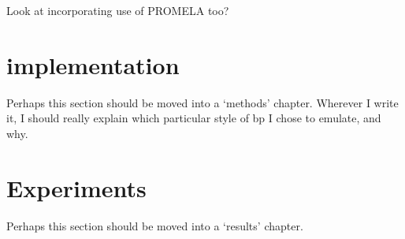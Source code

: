 Look at incorporating use of PROMELA too?

\section{ implementation}

Perhaps this section should be moved into a `methods' chapter.  Wherever I write it, I should really explain which particular style of \gls{bp} I chose to emulate, and why.

\section{Experiments}

Perhaps this section should be moved into a `results' chapter.